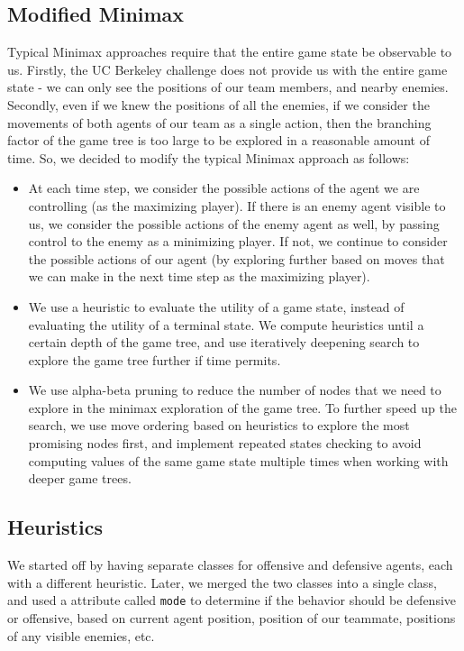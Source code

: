 \documentclass[a4paper,12pt]{article}
\begin{document}
\subsection{Modified Minimax}
\label{subsec:modified_minimax}
Typical Minimax approaches require that the entire game state be observable to us. Firstly, the UC Berkeley challenge does not provide us with the entire game state - we can only see the positions of our team members, and nearby enemies. Secondly, even if we knew the positions of all the enemies, if we consider the movements of both agents of our team as a single action, then the branching factor of the game tree is too large to be explored in a reasonable amount of time. So, we decided to modify the typical Minimax approach as follows:

\begin{itemize}
  \item At each time step, we consider the possible actions of the agent we are controlling (as the maximizing player). If there is an enemy agent visible to us, we consider the possible actions of the enemy agent as well, by passing control to the enemy as a minimizing player. If not, we continue to consider the possible actions of our agent (by exploring further based on moves that we can make in the next time step as the maximizing player). %
  \item We use a heuristic to evaluate the utility of a game state, instead of evaluating the utility of a terminal state. We compute heuristics until a certain depth of the game tree, and use iteratively deepening search to explore the game tree further if time permits.
  \item We use alpha-beta pruning to reduce the number of nodes that we need to explore in the minimax exploration of the game tree. To further speed up the search, we use move ordering based on heuristics to explore the most promising nodes first, and implement repeated states checking to avoid computing values of the same game state multiple times when working with deeper game trees.
\end{itemize}

\subsection{Heuristics}
\label{subsec:heuristics}

We started off by having separate classes for offensive and defensive agents, each with a different heuristic. Later, we merged the two classes into a single class, and used a attribute called \texttt{mode} to determine if the behavior should be defensive or offensive, based on current agent position, position of our teammate, positions of any visible enemies, etc. 
\end{document}
